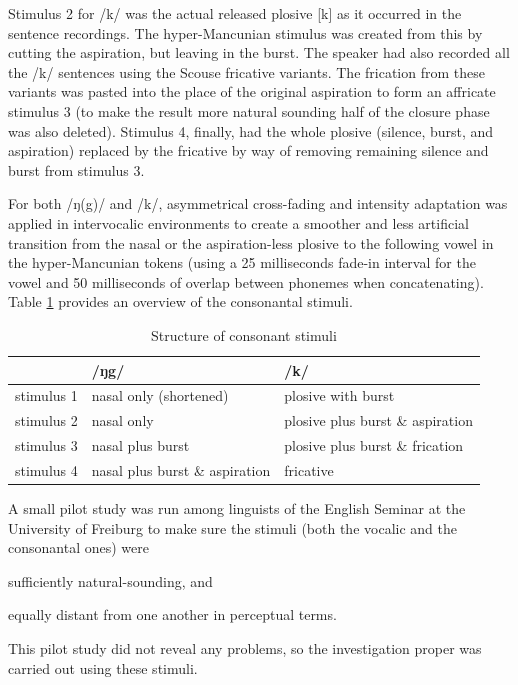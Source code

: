 Stimulus 2 for /k/ was the actual released plosive [k] as it occurred in the sentence recordings.
The hyper-Mancunian stimulus was created from this by cutting the aspiration, but leaving in the burst.
The speaker had also recorded all the /k/ sentences using the Scouse fricative variants.
The frication from these variants was pasted into the place of the original aspiration to form an affricate stimulus 3 (to make the result more natural sounding half of the closure phase was also deleted).
Stimulus 4, finally, had the whole plosive (silence, burst, and aspiration) replaced by the fricative by way of removing remaining silence and burst from stimulus 3.

For both /ŋ(g)/ and /k/, asymmetrical cross-fading and intensity adaptation was applied in intervocalic environments to create a smoother and less artificial transition from the nasal or the aspiration-less plosive to the following vowel in the hyper-Mancunian tokens (using a 25 milliseconds fade-in interval for the vowel and 50 milliseconds of overlap between phonemes when concatenating).
Table \ref{tab.consonant.stimuli} provides an overview of the consonantal stimuli.

\begin{table}
	\caption{Structure of consonant stimuli}
	\label{tab.consonant.stimuli}
	\centering
	\begin{tabular}{lll}
		\hline
		& /ŋg/ & /k/\\
		\hline
		stimulus 1 & nasal only (shortened) & plosive with burst\\
		stimulus 2 & nasal only & plosive plus burst \& aspiration\\
		stimulus 3 & nasal plus burst & plosive plus burst \& frication\\
		stimulus 4 & nasal plus burst \& aspiration & fricative\\
		\hline
	\end{tabular}
\end{table}

A small pilot study was run among linguists of the English Seminar at the University of Freiburg to make sure the stimuli (both the vocalic and the consonantal ones) were
\begin{inparaenum}[(a)]
	\item sufficiently natural-sounding, and
	\item equally distant from one another in perceptual terms.
\end{inparaenum}
This pilot study did not reveal any problems, so the investigation proper was carried out using these stimuli.

